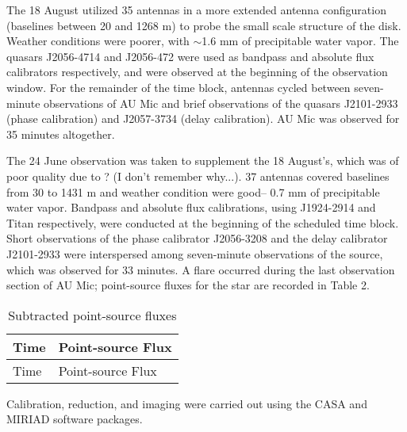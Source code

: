 \documentclass[a4paper]{tufte-handout}
\begin{document}
The 18 August utilized 35 antennas in a more extended antenna configuration (baselines between 20 and 1268 m) to probe the small scale structure of the disk. Weather conditions were poorer, with $\sim$1.6 mm of precipitable water vapor. The quasars J2056-4714 and J2056-472 were used as bandpass and absolute flux calibrators respectively, and were observed at the beginning of the observation window. For the remainder of the time block, antennas cycled between seven-minute observations of AU Mic and brief observations of the quasars J2101-2933 (phase calibration) and J2057-3734 (delay calibration). AU Mic was observed for 35 minutes altogether.

The 24 June observation was taken to supplement the 18 August's, which was of poor quality due to ? (I don't remember why...). 37 antennas covered baselines from 30 to 1431 m and weather condition were good-- 0.7 mm of precipitable water vapor. Bandpass and absolute flux calibrations, using J1924-2914 and Titan respectively, were conducted at the beginning of the scheduled time block. Short observations of the phase calibrator J2056-3208 and the delay calibrator J2101-2933 were interspersed among seven-minute observations of the source, which was observed for 33 minutes. A flare occurred during the last observation section of AU Mic; point-source fluxes for the star are recorded in Table 2.


\begin{table}
  \label{tab:flare fluxes}
  \caption{Subtracted point-source fluxes}
  \begin{tabu} to \textwidth {XX}
    \toprule
  	Time & Point-source Flux \\
    \midrule
  	Time & Point-source Flux \\
    \bottomrule
  \end{tabu}
\end{table}


Calibration, reduction, and imaging were carried out using the CASA and MIRIAD software packages.
\end{document}
